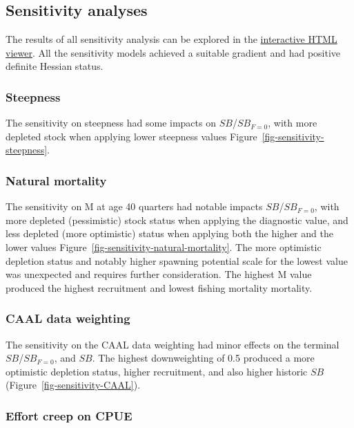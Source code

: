 \documentclass[
  english,
  a4paper,
  a4paper,
  11pt]{SCreport}
\begin{document}
\subsection{Sensitivity analyses}\label{sec-sensitivity-results}

The results of all sensitivity analysis can be explored in the
\href{https://pacificcommunity.github.io/ofp-sam-bet-2026-sensitivity/bet-2026-sensitivity-interactive-viewer.html}{interactive
HTML viewer}. All the sensitivity models achieved a suitable gradient
and had positive definite Hessian status.

\subsubsection{Steepness}\label{sec-oneoff-steepness}

The sensitivity on steepness had some impacts on \(SB\)/\(SB_{F=0}\),
with more depleted stock when applying lower steepness values
Figure~\ref{fig-sensitivity-steepness}.

\subsubsection{Natural mortality}\label{sec-oneoff-natural-mortality}

The sensitivity on M at age 40 quarters had notable impacts
\(SB\)/\(SB_{F=0}\), with more depleted (pessimistic) stock status when
applying the diagnostic value, and less depleted (more optimistic)
status when applying both the higher and the lower values
Figure~\ref{fig-sensitivity-natural-mortality}. The more optimistic
depletion status and notably higher spawning potential scale for the
lowest value was unexpected and requires further consideration. The
highest M value produced the highest recruitment and lowest fishing
mortality mortality.

\subsubsection{CAAL data
weighting}\label{sec-oneoff-caal-data-weighting}

The sensitivity on the CAAL data weighting had minor effects on the
terminal \(SB\)/\(SB_{F=0}\), and \(SB\). The highest downweighting of
0.5 produced a more optimistic depletion status, higher recruitment, and
also higher historic \(SB\) (Figure~\ref{fig-sensitivity-CAAL}).

\subsubsection{Effort creep on CPUE}\label{sec-oneoff-effort-creep}
\end{document}
